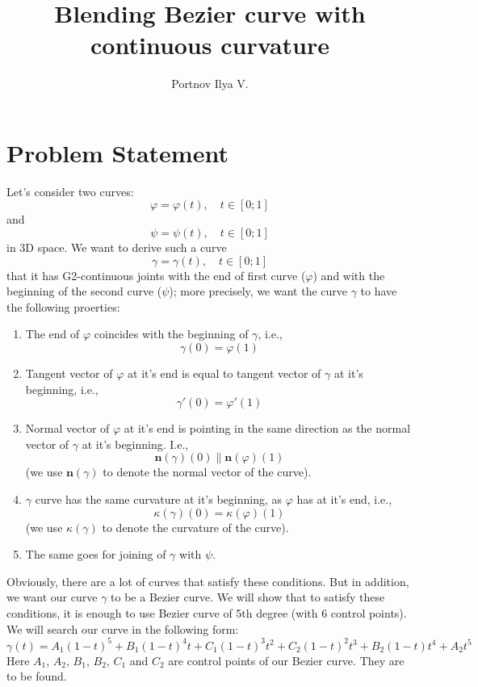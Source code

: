 \documentclass[12pt,a4paper]{article}
\author{Portnov Ilya V.}
\title{Blending Bezier curve with continuous curvature}
\begin{document}
\maketitle

\section{Problem Statement}

Let's consider two curves:
$$
\varphi = \varphi(t),\quad t\in[0;1]
$$
and
$$
\psi = \psi(t),\quad t\in[0;1]
$$
in 3D space. We want to derive such a curve
$$
\gamma = \gamma(t), \quad t\in[0;1]
$$
that it has G2-continuous joints with the end of first curve ($\varphi$) and with the beginning of the second curve ($\psi$); more precisely, we want the curve $\gamma$ to have the following proerties:
\begin{enumerate}
  \item The end of $\varphi$ coincides with the beginning of $\gamma$, i.e.,
    \begin{equation}\label{C0}
    \gamma(0) = \varphi(1)
    \end{equation}
  \item Tangent vector of $\varphi$ at it's end is equal to tangent vector of $\gamma$ at it's beginning, i.e.,
    \begin{equation}\label{C1}
    \gamma'(0) = \varphi'(1)
    \end{equation}
  \item Normal vector of $\varphi$ at it's end is pointing in the same direction as the normal vector of $\gamma$ at it's beginning. I.e.,
    \begin{equation}\label{normal}
    \mathbf{n}(\gamma)(0) \parallel \mathbf{n}(\varphi)(1)
    \end{equation}
    (we use $\mathbf{n}(\gamma)$ to denote the normal vector of the curve).
  \item $\gamma$ curve has the same curvature at it's beginning, as $\varphi$ has at it's end, i.e.,
    \begin{equation}\label{curvature}
    \kappa(\gamma)(0) = \kappa(\varphi)(1)
    \end{equation}
    (we use $\kappa(\gamma)$ to denote the curvature of the curve).
  \item The same goes for joining of $\gamma$ with $\psi$.
\end{enumerate}

Obviously, there are a lot of curves that satisfy these conditions. But in addition, we want our curve $\gamma$ to be a Bezier curve. We will show that to satisfy these conditions, it is enough to use Bezier curve of 5th degree (with 6 control points). We will search our curve in the following form:
\begin{equation}\label{bezier}
\gamma(t) = A_1(1-t)^5 + B_1(1-t)^4t + C_1(1-t)^3t^2 + C_2(1-t)^2t^3 + B_2(1-t)t^4 + A_2t^5
\end{equation}
Here $A_1$, $A_2$, $B_1$, $B_2$, $C_1$ and $C_2$ are control points of our Bezier curve. They are to be found.
\end{document}
